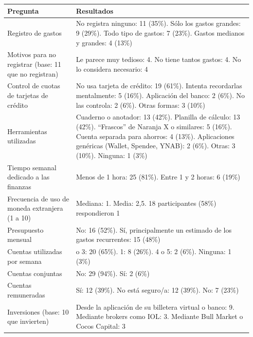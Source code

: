 {\def\LTcaptype{none} %
\begin{longtable}[]{@{}
  >{\raggedright\arraybackslash}p{}
  >{\raggedright\arraybackslash}p{}@{}}
\toprule\noalign{}
\begin{minipage}[b]{\linewidth}\raggedright
Pregunta
\end{minipage} & \begin{minipage}[b]{\linewidth}\raggedright
Resultados
\end{minipage} \\
\midrule\noalign{}
\endhead
\bottomrule\noalign{}
\endlastfoot
Registro de gastos & No registra ninguno: 11 (35\%). Sólo los gastos
grandes: 9 (29\%). Todo tipo de gastos: 7 (23\%). Gastos medianos y
grandes: 4 (13\%) \\
Motivos para no registrar (base: 11 que no registran) & Le parece muy
tedioso: 4. No tiene tantos gastos: 4. No lo considera necesario: 4 \\
Control de cuotas de tarjetas de crédito & No usa tarjeta de crédito: 19
(61\%). Intenta recordarlas mentalmente: 5 (16\%). Aplicación del banco:
2 (6\%). No las controla: 2 (6\%). Otras formas: 3 (10\%) \\
Herramientas utilizadas & Cuaderno o anotador: 13 (42\%). Planilla de
cálculo: 13 (42\%). ``Frascos'' de Naranja X o similares: 5 (16\%).
Cuenta separada para ahorros: 4 (13\%). Aplicaciones genéricas (Wallet,
Spendee, YNAB): 2 (6\%). Otras: 3 (10\%). Ninguna: 1 (3\%) \\
Tiempo semanal dedicado a las finanzas & Menos de 1 hora: 25 (81\%).
Entre 1 y 2 horas: 6 (19\%) \\
Frecuencia de uso de moneda extranjera (1 a 10) & Mediana: 1. Media:
2,5. 18 participantes (58\%) respondieron 1 \\
Presupuesto mensual & No: 16 (52\%). Sí, principalmente un estimado de
los gastos recurrentes: 15 (48\%) \\
Cuentas utilizadas por semana & 2 o 3: 20 (65\%). 1: 8 (26\%). 4 o 5: 2
(6\%). Ninguna: 1 (3\%) \\
Cuentas conjuntas & No: 29 (94\%). Sí: 2 (6\%) \\
Cuentas remuneradas & Sí: 12 (39\%). No está seguro/a: 12 (39\%). No: 7
(23\%) \\
Inversiones (base: 10 que invierten) & Desde la aplicación de su
billetera virtual o banco: 9. Mediante brokers como IOL: 3. Mediante
Bull Market o Cocos Capital: 3 \\
\end{longtable}
}

